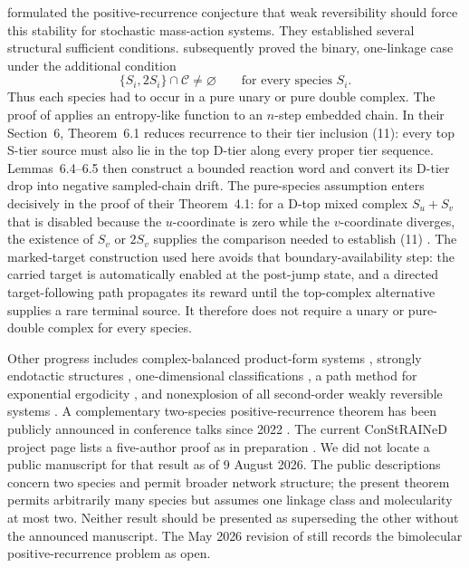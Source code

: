 \citet{AndersonKim2018} formulated the positive-recurrence conjecture that
weak reversibility should force this stability for stochastic mass-action
systems.  They established several structural sufficient conditions.
\citet{AndersonCappellettiKim2020} subsequently proved the binary,
one-linkage case under the additional condition
\begin{equation}\label{eq:ACK-condition}
  \{S_i,2S_i\}\cap\mathcal C\ne\varnothing
  \qquad\text{for every species }S_i.
\end{equation}
Thus each species had to occur in a pure unary or pure double complex.  The
proof of \citet{AndersonCappellettiKim2020} applies an entropy-like
function to an \(n\)-step embedded chain.  In their Section~6, Theorem~6.1
reduces recurrence to their tier inclusion (11): every top S-tier source must
also lie in the top D-tier along every proper tier sequence.  Lemmas~6.4--6.5
then construct a bounded reaction word and convert its D-tier drop into
negative sampled-chain drift.  The pure-species assumption enters decisively
in the proof of their Theorem~4.1: for a D-top mixed complex \(S_u+S_v\) that
is disabled because the \(u\)-coordinate is zero while the \(v\)-coordinate
diverges, the existence of \(S_v\) or \(2S_v\) supplies the comparison needed
to establish (11) \citep[Section~6.1, equations~(19)--(20), pp.~808--809]
{AndersonCappellettiKim2020}.  The marked-target construction used here avoids
that boundary-availability step: the carried target is automatically enabled
at the post-jump state, and a directed target-following path propagates its
reward until the top-complex alternative supplies a rare terminal source.  It
therefore does not require a unary or pure-double complex for every species.

Other progress includes complex-balanced product-form systems
\citep{AndersonCraciunKurtz2010}, strongly endotactic structures
\citep{AndersonCappellettiKimNguyen2020}, one-dimensional classifications
\citep{WiufXu2023}, a path method for exponential ergodicity
\citep{AndersonCappellettiFanKim2025}, and nonexplosion of all second-order
weakly reversible systems \citep{Xu2026}.  A complementary two-species
positive-recurrence theorem has been publicly announced in conference talks
since 2022 \citep{Agazzi2022Talk,Agazzi2025Talk}.  The current ConStRAINeD
project page lists a five-author proof as in preparation
\citep{ConStRAINeDResults}.  We did not locate a public manuscript for that
result as of 9 August 2026.  The public descriptions concern two species and
permit broader network structure; the present theorem permits arbitrarily many
species but assumes one linkage class and molecularity at most two.  Neither
result should be presented as superseding the other without the announced
manuscript.  The May 2026
revision of \citet{Xu2026} still records the bimolecular positive-recurrence
problem as open.

